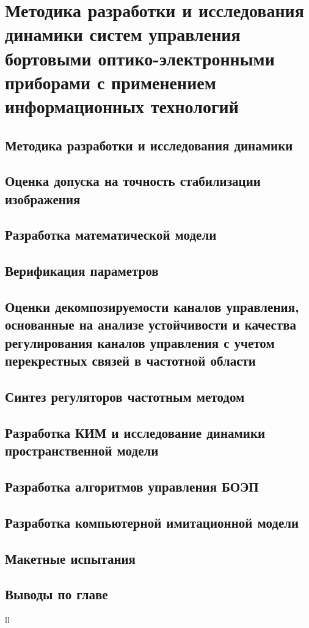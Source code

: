 \chapter{Методика разработки и исследования динамики систем управления бортовыми оптико-электронными приборами с применением информационных технологий} \label{ch:ch2}

\section{Методика разработки и исследования динамики} \label{sec:ch2/sec1}

\section{Оценка допуска на точность стабилизации изображения} \label{sec:ch2/sec1}

\section{Разработка математической модели} \label{sec:ch2/sec1}

\section{Верификация параметров} \label{sec:ch2/sec1}

\section{Оценки декомпозируемости каналов управления, основанные на анализе устойчивости и качества регулирования каналов управления с учетом перекрестных связей в частотной области} \label{sec:ch2/sec1}

\section{Синтез регуляторов частотным методом} \label{sec:ch2/sec1}

\section{Разработка КИМ и исследование динамики пространственной модели} \label{sec:ch2/sec1}

\section{Разработка алгоритмов управления БОЭП} \label{sec:ch2/sec1}

\section{Разработка компьютерной имитационной модели} \label{sec:ch2/sec1}

\section{Макетные испытания} \label{sec:ch2/sec1}

\section{Выводы по главе} \label{sec:ch2/sec1}



ll
